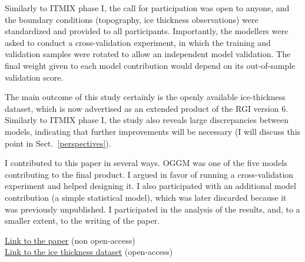 Similarly to ITMIX phase I, the call for participation was open to anyone, and the boundary conditions (topography, ice
thickness observations) were standardized and provided to all participants. Importantly, the modellers were asked to
conduct a cross-validation experiment, in which the training and validation samples were rotated to allow an independent
model validation. The final weight given to each model contribution would depend on its out-of-sample validation score.

The main outcome of this study certainly is the openly available ice-thickness dataset, which is now advertised as an
extended product of the RGI version 6. Similarly to ITMIX phase I, the study also reveals large discrepancies between
models, indicating that further improvements will be necessary (I will discuss this point
in Sect.~\ref{perspectives}).

I contributed to this paper in several ways. OGGM was one of the five models contributing to the final product. 
I argued in favor of running a cross-validation experiment and helped designing it. I also participated with an 
additional model contribution (a simple statistical model), which was later discarded because it was previously unpublished.
I participated in the analysis of the results, and, to a smaller extent, to the writing of the paper.

\href{https://doi.org/10.1038/s41561-019-0300-3}{Link to the paper} (non open-access) \\
\href{https://doi.org/10.3929/ethz-b-000315707}{Link to the ice thickness dataset} (open-access)

\iflong  \else \fi 

